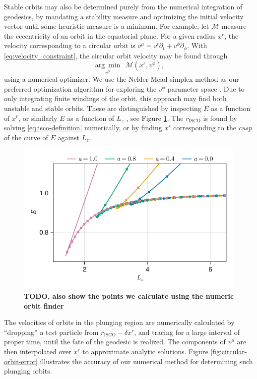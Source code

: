 \documentclass[fleqn,usenatbib]{mnras}
\newcommand{\todo}[1]{{\bf \color{red} #1}}
\newcommand{\risco}{r_\text{ISCO}}
\begin{document}
Stable orbits may also be determined purely from the numerical integration of
geodesics, by mandating a stability measure and optimizing the initial velocity
vector until some heuristic measure is a minimum. For example, let $\mathscr{M}$
measure the eccentricity of an orbit in the equatorial plane. For a given radius
$x^r$, the velocity corresponding to a circular orbit is $v^\mu = v^t \partial_t
+ v^\phi \partial_\phi $. With \eqref{eq:velocity_constraint}, the circular
orbit velocity may be found through
\begin{equation}
    \underset{v^\phi}{\arg \min}\ \ \mathscr{M}(x^r, v^\phi),
\end{equation}
using a numerical optimizer. We use the Nelder-Mead simplex method as our
preferred optimization algorithm for exploring the $v^\phi$ parameter space
\citep{nelder_simplex_1965}. Due to only integrating finite windings of the
orbit, this approach may find both unstable and stable orbits. These are 
distinguished by inspecting $E$ as a function of $x^r$, or similarly $E$ as a
function of $L_z$ \citep{hackmann_charged_2013}, see Figure \ref{fig:e-lz-cusp}.
The $\risco$ is found by solving \eqref{eq:isco-definition} numerically, or
by finding $x^r$ corresponding to the \emph{cusp} of the curve of  $E$ against
$L_z$.

\begin{figure}
    \centering
    \includegraphics[width=0.95\linewidth]{figures/circular-orbits.E-Lz.pdf}
    \caption{\todo{TODO, also show the points we calculate using the numeric orbit finder}}
    \label{fig:e-lz-cusp}
\end{figure}

The velocities of orbits in the plunging region are numerically calculated by
``dropping'' a test particle from $\risco -  \delta x^r$, and tracing for a
large interval of proper time, until the fate of the geodesic is realized. The
components of $v^\mu$ are then interpolated over $x^r$ to approximate analytic
solutions. Figure \ref{fig:circular-orbit-error} illustrates the accuracy of our
numerical method for determining such plunging orbits.
\end{document}
